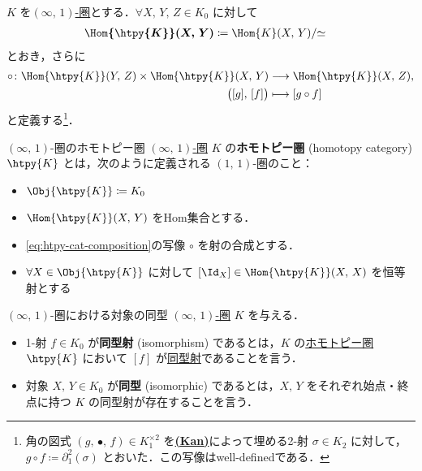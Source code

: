 \documentclass[TQFT_main]{subfiles}
\begin{document}
$K$ を\hyperref[def:infinity-1]{$(\infty,\, 1)$-圏}とする．$\forall X,\, Y,\, Z \in K_0$ に対して
\begin{align}
    \bm{\Hom{\htpy{K}} (X,\, Y)} &\coloneqq \Hom{K} (X,\, Y)/{\simeq}
\end{align}
とおき，さらに
\begin{align}
    \label{eq:htpy-cat-composition}
    \circ \colon \Hom{\htpy{K}}(Y,\, Z) \times \Hom{\htpy{K}}(X,\, Y) &\lto \Hom{\htpy{K}} (X,\, Z), \\
    \bigl([g],\, [f]\bigr) &\lmto [g \circ f]
\end{align}
と定義する\footnote{角の図式 $(g,\, \bullet,\, f) \in K_1^{\times 2}$ を\hyperref[def:KanCplx]{\textsf{\textbf{(Kan)}}}によって埋める2-射 $\sigma \in K_2$ に対して，$g \circ f \coloneqq \partial^2_1 (\sigma)$ とおいた．この写像はwell-definedである．}．
    

\begin{mydef}[label=def:hcat-infty,breakable]{{$(\infty,\, 1)$}-圏のホモトピー圏}
    \hyperref[def:infinity-1]{$(\infty,\, 1)$-圏} $K$ の\textbf{ホモトピー圏} (homotopy category) $\htpy{K}$ とは，次のように定義される $(1,\, 1)$-圏のこと：
    \begin{itemize}
        \item $\Obj{\htpy{K}} \coloneqq K_0$
        \item $\Hom{\htpy{K}} (X,\, Y)$ をHom集合とする．
        \item \eqref{eq:htpy-cat-composition}の写像 $\circ$ を射の合成とする．
        \item $\forall X \in \Obj{\htpy{K}}$ に対して $[\Id_X] \in \Hom{\htpy{K}}(X,\, X)$ を恒等射とする
    \end{itemize}
\end{mydef}

\begin{mydef}[label=def:isom-infty]{{$(\infty,\, 1)$}-圏における対象の同型}
    \hyperref[def:infinity-1]{$(\infty,\, 1)$-圏} $K$ を与える．
    \begin{itemize}
        \item 1-射 $f \in K_0$ が\textbf{同型射} (isomorphism) であるとは，$K$ の\hyperref[def:hcat-infty]{ホモトピー圏} $\htpy{K}$ において $[f]$ が\hyperref[def:iso]{同型射}であることを言う．
        \item 対象 $X,\, Y \in K_0$ が\textbf{同型} (isomorphic) であるとは，$X,\, Y$ をそれぞれ始点・終点に持つ $K$ の同型射が存在することを言う．
    \end{itemize}
\end{mydef}
\end{document}
